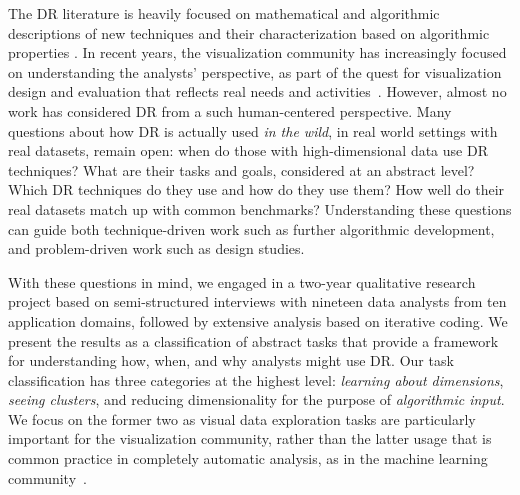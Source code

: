 The \ac{DR} literature is heavily focused on mathematical and algorithmic descriptions of new techniques and their characterization based on algorithmic properties \cite{Cunningham2008,France2011,Guyon2003,Jain2000,VanderMaaten2009,Witten2011}. 
In recent years, the visualization community has increasingly focused on understanding the analysts' perspective, as part of the quest for visualization design and evaluation that reflects real needs and activities~\cite{Kandel2012,Kang2011,Munzner2009}.
However, almost no work has considered \ac{DR} from a such human-centered perspective.
Many questions about how \ac{DR} is actually used {\it in the wild}, in real world settings with real datasets, remain open: when do those with high-dimensional data use \ac{DR} techniques? 
What are their tasks and goals, considered at an abstract level? 
Which \ac{DR} techniques do they use and how do they use them? 
How well do their real datasets match up with common benchmarks? Understanding these questions can guide both technique-driven work such as further algorithmic development, and problem-driven work such as design studies. 

With these questions in mind, we engaged in a two-year qualitative research project based on semi-structured interviews with nineteen data analysts from ten application domains, followed by extensive analysis based on iterative coding. 
We present the results as a classification of abstract tasks that provide a framework for understanding how, when, and why analysts might use \ac{DR}. 
Our task classification has three categories at the highest level: {\it learning about dimensions}, {\it seeing clusters}, and reducing dimensionality for the purpose of {\it algorithmic input}. 
We focus on the former two as visual data exploration tasks are particularly important for the visualization community, rather than the latter usage that is common practice in completely automatic analysis, as in the machine learning community~\cite{Murphy2012}.

